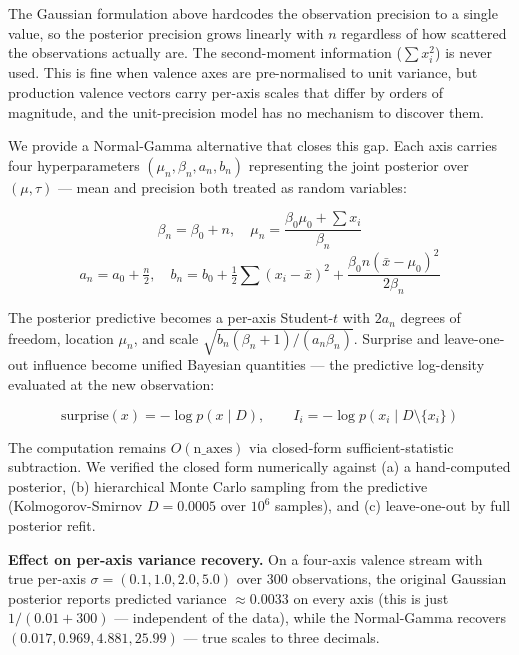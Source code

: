 \documentclass[11pt]{article}
\begin{document}
The Gaussian formulation above hardcodes the observation precision to a single value, so the posterior precision grows linearly with $n$ regardless of how scattered the observations actually are. The second-moment information ($\sum x_i^2$) is never used. This is fine when valence axes are pre-normalised to unit variance, but production valence vectors carry per-axis scales that differ by orders of magnitude, and the unit-precision model has no mechanism to discover them.

We provide a Normal-Gamma alternative \citep{bishop2006} that closes this gap. Each axis carries four hyperparameters $(\mu_n, \beta_n, a_n, b_n)$ representing the joint posterior over $(\mu, \tau)$ --- mean and precision both treated as random variables:

\begin{equation}
\beta_n = \beta_0 + n, \quad \mu_n = \frac{\beta_0 \mu_0 + \sum x_i}{\beta_n}
\end{equation}
\begin{equation}
a_n = a_0 + \tfrac{n}{2}, \quad b_n = b_0 + \tfrac{1}{2}\sum (x_i - \bar{x})^2 + \frac{\beta_0 n (\bar{x} - \mu_0)^2}{2\beta_n}
\end{equation}

The posterior predictive becomes a per-axis Student-$t$ with $2 a_n$ degrees of freedom, location $\mu_n$, and scale $\sqrt{b_n(\beta_n + 1)/(a_n \beta_n)}$. Surprise and leave-one-out influence become unified Bayesian quantities --- the predictive log-density evaluated at the new observation:

\begin{equation}
\text{surprise}(x) = -\log p(x \mid D), \qquad I_i = -\log p(x_i \mid D \setminus \{x_i\})
\end{equation}

The computation remains $O(\text{n\_axes})$ via closed-form sufficient-statistic subtraction. We verified the closed form numerically against (a) a hand-computed posterior, (b) hierarchical Monte Carlo sampling from the predictive (Kolmogorov-Smirnov $D = 0.0005$ over $10^6$ samples), and (c) leave-one-out by full posterior refit.

\textbf{Effect on per-axis variance recovery.} On a four-axis valence stream with true per-axis $\sigma = (0.1, 1.0, 2.0, 5.0)$ over 300 observations, the original Gaussian posterior reports predicted variance $\approx 0.0033$ on every axis (this is just $1/(0.01 + 300)$ --- independent of the data), while the Normal-Gamma recovers $(0.017, 0.969, 4.881, 25.99)$ --- true scales to three decimals.
\end{document}
